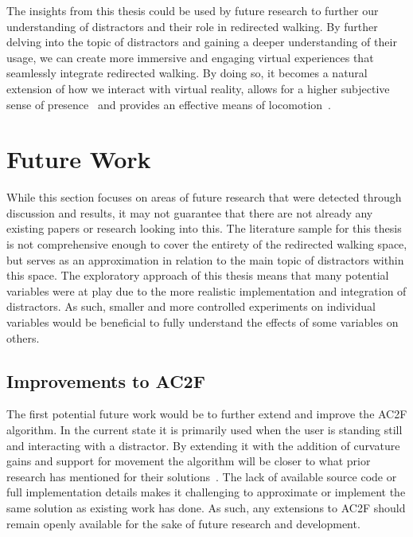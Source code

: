 The insights from this thesis could be used by future research to further our understanding of distractors and their role in redirected walking. By further delving into the topic of distractors and gaining a deeper understanding of their usage, we can create more immersive and engaging virtual experiences that seamlessly integrate redirected walking. By doing so, it becomes a natural extension of how we interact with virtual reality, allows for a higher subjective sense of presence~\cite{peck2009evaluation, peck2011evaluation} and provides an effective means of locomotion~\cite{razzaque2001redirected, peck2011evaluation}.

\iffalse
   * This has provided insights for more predictive algorithms that it may not always be ideal to align towards centre. Depends whether they switch between algorithms or not though
\fi

\section{Future Work}\label{sec:futurework}
While this section focuses on areas of future research that were detected through discussion and results, it may not guarantee that there are not already any existing papers or research looking into this. The literature sample for this thesis is not comprehensive enough to cover the entirety of the redirected walking space, but serves as an approximation in relation to the main topic of distractors within this space. The exploratory approach of this thesis means that many potential variables were at play due to the more realistic implementation and integration of distractors. As such, smaller and more controlled experiments on individual variables would be beneficial to fully understand the effects of some variables on others.

\subsection{Improvements to AC2F}
The first potential future work would be to further extend and improve the AC2F algorithm. In the current state it is primarily used when the user is standing still and interacting with a distractor. By extending it with the addition of curvature gains and support for movement the algorithm will be closer to what prior research has mentioned for their solutions~\cite{peck2010improved, chen2017towards, chen2017supporting}. The lack of available source code or full implementation details makes it challenging to approximate or implement the same solution as existing work has done. As such, any extensions to AC2F should remain openly available for the sake of future research and development. 

